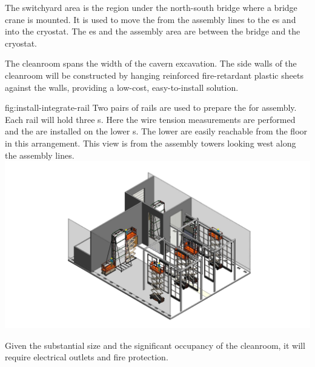 The switchyard area is the region under the north-south bridge where a bridge crane is mounted. It is used to move the  from the assembly lines to the \coldbox{}es and into the cryostat. The \coldbox{}es and the  assembly area are between the bridge and the cryostat.


The cleanroom %
spans the width of the cavern excavation. The side walls of the cleanroom will be constructed by hanging reinforced fire-retardant plastic sheets against the walls, providing a low-cost, easy-to-install solution. %


\begin{dunefigure}{fig:install-integrate-rail}
  {Two pairs of rails are used to prepare the  for assembly. Each rail will hold three s. Here the wire tension measurements are performed and the   are installed on the lower s. The lower  are easily reachable from the floor in this arrangement. This view is from the assembly towers looking west along the assembly lines.}
\includegraphics[width=.8\textwidth]{graphics/install-integrate-rail.pdf}
\end{dunefigure}

Given the substantial size and the significant occupancy of the cleanroom, it will %
require electrical outlets %
and fire protection. 


